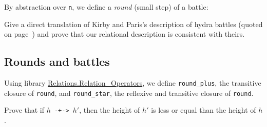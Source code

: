 

By abstraction over \texttt{n}, we define a \emph{round} (small step) of a battle:

\label{sect:infix-round}




\begin{project}
Give a direct translation of Kirby and Paris's description of hydra battles (quoted on page~\pageref{original-rules}) and prove that our relational description is consistent with theirs.
\end{project}


\subsection{Rounds and battles}


Using library \href{https://coq.inria.fr/distrib/current/stdlib/Coq.Relations.Relation_Operators.html}{Relations.Relation\_Operators}, we define \texttt{round\_plus},  the transitive closure of \texttt{round}, and \texttt{round\_star},  the reflexive and transitive closure of \texttt{round}.

\label{sect:infix-rounds} 




\begin{exercise}
  Prove that if \texttt{$h$ -+-> $h'$}, then
  the height of $h'$ is less or equal than the height of $h$.

\end{exercise}

